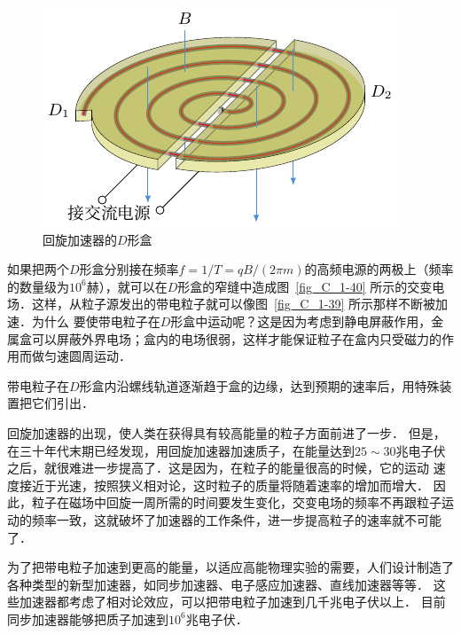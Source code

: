 \begin{figure}[htbp]
	\centering
	\includegraphics{fig/C/1-41.pdf}
	\caption{回旋加速器的$D$形盒}\label{fig_C_1-41}
\end{figure}


如果把两个$D$形盒分别接在频率$f=1/T=qB/(2\pi m)$的高频电源的两极上（频率的数量级为$10^6$赫），就可以在$D$形盒的窄缝中造成图~\ref{fig_C_1-40} 所示的交变电场．这样，从粒子源发出的带电粒子就可以像图~\ref{fig_C_1-39} 所示那样不断被加速．为什么
要使带电粒子在$D$形盒中运动呢？这是因为考虑到静电屏蔽作用，金属盒可以屏蔽外界电场；盒内的电场很弱，这样才能保证粒子在盒内只受磁力的作用而做匀速圆周运动．

带电粒子在$D$形盒内沿螺线轨道逐渐趋于盒的边缘，达到预期的速率后，用特殊装置把它们引出．

回旋加速器的出现，使人类在获得具有较高能量的粒子方面前进了一步．
但是，在三十年代末期已经发现，用回旋加速器加速质子，在能量达到$25 \sim 30$兆电子伏之后，就很难进一步提高了．这是因为，在粒子的能量很高的时候，它的运动
速度接近于光速，按照狭义相对论，这时粒子的质量将随着速率的增加而增大．
因此，粒子在磁场中回旋一周所需的时间要发生变化，交变电场的频率不再跟粒子运动的频率一致，这就破坏了加速器的工作条件，进一步提高粒子的速率就不可能了．

为了把带电粒子加速到更高的能量，以适应高能物理实验的需要，人们设计制造了各种类型的新型加速器，如同步加速器、电子感应加速器、直线加速器等等．
这些加速器都考虑了相对论效应，可以把带电粒子加速到几千兆电子伏以上．
目前同步加速器能够把质子加速到$10^6$兆电子伏．


